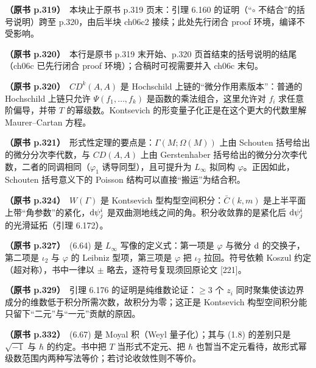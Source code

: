 \noindent \textbf{（原书 p.319）}\ 本块止于原书 p.319 页末：引理 6.160 的证明（“$\circ$ 不结合”的括号说明）跨至 p.320，由后半块 ch06c2 接续；此处先行闭合 proof 环境，编译不受影响。\par\smallskip

\noindent \textbf{（原书 p.320）}\ 本行是原书 p.319 末开始、p.320 页首结束的括号说明的结尾（ch06c 已先行闭合 proof 环境）；合稿时可视需要并入 ch06c 末句。\par\smallskip

\noindent \textbf{（原书 p.320）}\ $CD^k(A,A)$ 是 Hochschild 上链的“微分作用素版本”：普通的 Hochschild 上链只允许 $\Psi(f_1,\dots,f_k)$ 是函数的乘法组合，这里允许对 $f_i$ 求任意阶偏导，并带 $T$ 的幂级数。Kontsevich 的形变量子化正是在这个更大的代数里解 Maurer–Cartan 方程。\par\smallskip

\noindent \textbf{（原书 p.321）}\ 形式性定理的要点是：$\Gamma(M;\Omega(M))$ 上由 Schouten 括号给出的微分分次李代数，与 $CD(A,A)$ 上由 Gerstenhaber 括号给出的微分分次李代数，二者的同调相同（$\varphi_1$ 诱导同型），且可提升为 $L_{\infty}$ 拟同构 $\varphi$。正因如此，Schouten 括号意义下的 Poisson 结构可以直接“搬运”为结合积。\par\smallskip

\noindent \textbf{（原书 p.324）}\ $W(\Gamma)$ 是 Kontsevich 型构型空间积分：$\bar C(k,m)$ 是上半平面上带“角参数”的紧化，$\mathrm{d}\psi^i_j$ 是双曲测地线之间的角。积分收敛靠的是紧化后 $\mathrm{d}\psi^i_j$ 的光滑延拓（引理 6.172）。\par\smallskip

\noindent \textbf{（原书 p.327）}\ (6.64) 是 $L_{\infty}$ 写像的定义式：第一项是 $\varphi$ 与微分 $\mathrm{d}$ 的交换子，第二项是 $\iota_2$ 与 $\varphi$ 的 Leibniz 型项，第三项是 $\varphi$ 把 $\iota_2$ 拉回。符号依赖 Koszul 约定（超对称），书中一律以 $\pm$ 略去，逐符号复现须回原论文 [221]。\par\smallskip

\noindent \textbf{（原书 p.329）}\ 引理 6.176 的证明是纯维数论证：$\ge3$ 个 $z_i$ 同时聚集使该边界成分的维数低于积分所需次数，故积分为零；这正是 Kontsevich 构型空间积分能只留下“二元”与“一元”贡献的原因。\par\smallskip

\noindent \textbf{（原书 p.332）}\ (6.67) 是 Moyal 积（Weyl 量子化）；其与 (1.8) 的差别只是 $\sqrt{-1}$ 与 $\hbar$ 的约定。书中把 $T$ 当形式不定元、把 $\hbar$ 也暂当不定元看待，故形式幂级数范围内两种写法等价；若讨论收敛性则不等价。\par\smallskip

